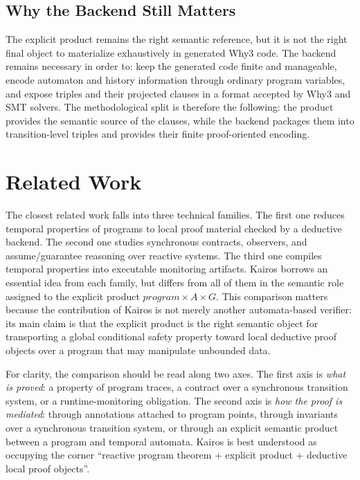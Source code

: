 \documentclass[11pt,a4paper]{article}
\begin{document}
\subsection{Why the Backend Still Matters}

The explicit product remains the right semantic reference, but it is not the
right final object to materialize exhaustively in generated Why3 code. The
backend remains necessary in order to:
keep the generated code finite and manageable, encode automaton and history
information through ordinary program variables, and expose triples and their
projected clauses in a format accepted by Why3 and SMT solvers.
The methodological split is therefore the following:
the product provides the semantic source of the clauses, while the backend
packages them into transition-level triples and provides their finite
proof-oriented encoding.

\section{Related Work}

The closest related work falls into three technical families. The first one
reduces temporal properties of programs to local proof material checked by a
deductive backend. The second one studies synchronous contracts, observers, and
assume/guarantee reasoning over reactive systems. The third one compiles
temporal properties into executable monitoring artifacts. Kairos borrows an
essential idea from each family, but differs from all of them in the semantic
role assigned to the explicit product \(program \times A \times G\). This
comparison matters because the contribution of Kairos is not merely another
automata-based verifier: its main claim is that the explicit product is the
right semantic object for transporting a global conditional safety property
toward local deductive proof objects over a program that may manipulate
unbounded data.

For clarity, the comparison should be read along two axes. The first axis is
\emph{what is proved}: a property of program traces, a contract over a
synchronous transition system, or a runtime-monitoring obligation. The second
axis is \emph{how the proof is mediated}: through annotations attached to
program points, through invariants over a synchronous transition system, or
through an explicit semantic product between a program and temporal automata.
Kairos is best understood as occupying the corner ``reactive program theorem +
explicit product + deductive local proof objects''.
\end{document}
